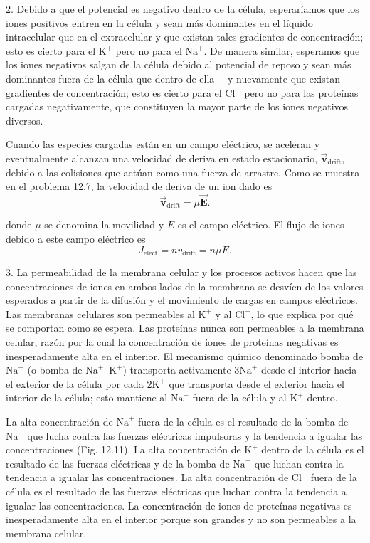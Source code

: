\documentclass[12pt]{book}
\begin{document}
2. Debido a que el potencial es negativo dentro de la célula, esperaríamos que los iones positivos entren en la célula y sean más dominantes en el líquido intracelular que en el extracelular y que existan tales gradientes de concentración; esto es cierto para el $\text{K}^+$ pero no para el $\text{Na}^+$. De manera similar, esperamos que los iones negativos salgan de la célula debido al potencial de reposo y sean más dominantes fuera de la célula que dentro de ella ---y nuevamente que existan gradientes de concentración; esto es cierto para el $\text{Cl}^-$ pero no para las proteínas cargadas negativamente, que constituyen la mayor parte de los iones negativos diversos.

Cuando las especies cargadas están en un campo eléctrico, se aceleran y eventualmente alcanzan una velocidad de deriva en estado estacionario, $\vec{\mathbf{v}}_{\text{drift}}$, debido a las colisiones que actúan como una fuerza de arrastre. Como se muestra en el problema 12.7, la velocidad de deriva de un ion dado es
\begin{equation}
\vec{\mathbf{v}}_{\text{drift}} = \mu \vec{\mathbf{E}}. \label{eq:12.16}
\end{equation}

donde $\mu$ se denomina la movilidad y $E$ es el campo eléctrico. El flujo de iones debido a este campo eléctrico es
\begin{equation}
J_{\text{elect}} = n v_{\text{drift}} = n \mu E. \label{eq:12.17}
\end{equation}

3. La permeabilidad de la membrana celular y los procesos activos hacen que las concentraciones de iones en ambos lados de la membrana se desvíen de los valores esperados a partir de la difusión y el movimiento de cargas en campos eléctricos. Las membranas celulares son permeables al $\text{K}^+$ y al $\text{Cl}^-$, lo que explica por qué se comportan como se espera. Las proteínas nunca son permeables a la membrana celular, razón por la cual la concentración de iones de proteínas negativas es inesperadamente alta en el interior. El mecanismo químico denominado bomba de $\text{Na}^+$ (o bomba de $\text{Na}^+$--$\text{K}^+$) transporta activamente $3\text{Na}^+$ desde el interior hacia el exterior de la célula por cada $2\text{K}^+$ que transporta desde el exterior hacia el interior de la célula; esto mantiene al $\text{Na}^+$ fuera de la célula y al $\text{K}^+$ dentro.

La alta concentración de $\text{Na}^+$ fuera de la célula es el resultado de la bomba de $\text{Na}^+$ que lucha contra las fuerzas eléctricas impulsoras y la tendencia a igualar las concentraciones (Fig. 12.11). La alta concentración de $\text{K}^+$ dentro de la célula es el resultado de las fuerzas eléctricas y de la bomba de $\text{Na}^+$ que luchan contra la tendencia a igualar las concentraciones. La alta concentración de $\text{Cl}^-$ fuera de la célula es el resultado de las fuerzas eléctricas que luchan contra la tendencia a igualar las concentraciones. La concentración de iones de proteínas negativas es inesperadamente alta en el interior porque son grandes y no son permeables a la membrana celular.
\end{document}
